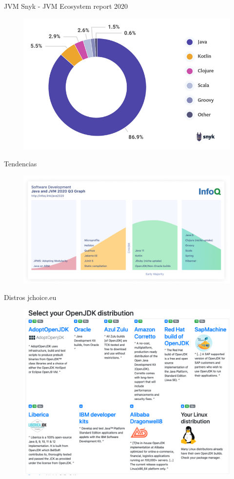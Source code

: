 \documentclass[aspectratio=169]{beamer}
\begin{document}
\begin{frame}{JVM}
	Snyk - JVM Ecosystem report 2020

	\begin{figure}
		\centering
		\includegraphics[width=0.7\linewidth]{Images/jvmlangs}
	\end{figure}

\end{frame}

\begin{frame}{Tendencias}
	\begin{figure}
		\centering
		\includegraphics[width=\linewidth]{Images/trends}
	\end{figure}

\end{frame}

\begin{frame}{Distros}
jchoice.eu
	\begin{figure}
		\centering
		\includegraphics[width=0.7\linewidth]{Images/jdkdistros}
	\end{figure}

\end{frame}
\end{document}
